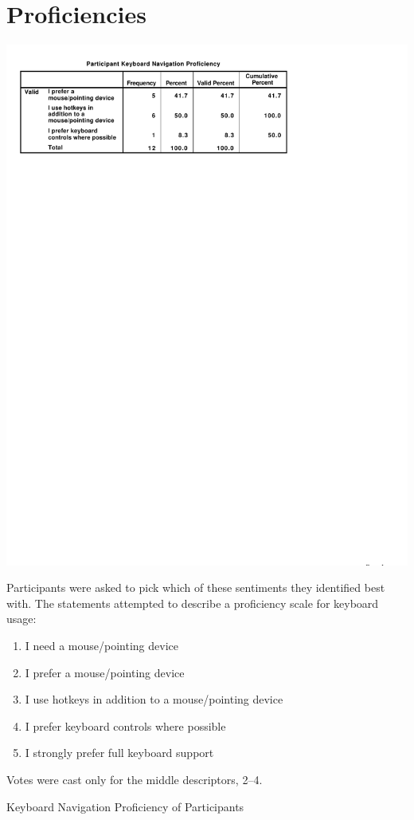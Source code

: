 \documentclass[11pt,openright,a4paper]{report}
\begin{document}
\section{Proficiencies}
\begin{table}[ht]
\centerline{\includegraphics{figures/Proficiency.pdf}}
\medskip
\small
Participants were asked to pick which of these sentiments they identified best with. The statements attempted to describe a proficiency scale for keyboard usage:
\begin{enumerate}
\item I need a mouse/pointing device
\item I prefer a mouse/pointing device
\item I use hotkeys in addition to a mouse/pointing device
\item I prefer keyboard controls where possible
\item I strongly prefer full keyboard support
\end{enumerate}
Votes were cast only for the middle descriptors, 2--4.
\caption{Keyboard Navigation Proficiency of Participants}
\label{fig:partic_proficiency}

\end{table}
\end{document}
